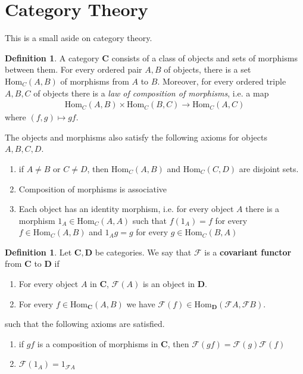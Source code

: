 \documentclass[12pt]{book}
\theoremstyle{definition}
\newtheorem{definition}[theorem]{Definition}
\begin{document}
\section{Category Theory}
This is a small aside on category theory. 
\begin{definition}
    A category \textbf{C} consists of a class of objects and sets of morphisms between them. For every ordered pair $A, B$ of objects, there is a set $\text{Hom}_C(A,B)$ of morphisms from $A$ to $B$. Moreover, for every ordered triple $A, B, C$ of objects there is a \textit{law of composition of morphisms}, i.e. a map 
    \begin{align*}
        \text{Hom}_C(A,B) \times \text{Hom}_C(B,C) \rightarrow \text{Hom}_C(A,C)
    \end{align*}
    where $(f,g) \mapsto gf$. 
\end{definition}
The objects and morphisms also satisfy the following axioms for objects $A, B, C, D$. 
\begin{enumerate}
    \item if $A \neq B$ or $C \neq D$, then $\text{Hom}_C(A,B)$ and $\text{Hom}_C(C,D)$ are disjoint sets. 
    \item Composition of morphisms is associative 
    \item Each object has an identity morphism, i.e. for every object $A$ there is a morphism $1_A \in \text{Hom}_C(A,A)$ such that $f(1_A) = f$ for every $f \in \text{Hom}_C(A,B)$ and $1_Ag = g$ for every $g \in \text{Hom}_C(B, A)$
\end{enumerate}

\begin{definition}
    Let $\mathbf{C,D}$ be categories. We say that $\mathcal{F}$ is a \textbf{covariant functor} from $\mathbf{C}$ to $\mathbf{D}$ if 
    \begin{enumerate}
        \item For every object $A$ in $\mathbf{C}$, $\mathcal{F}(A)$ is an object in $\mathbf{D}$. 
        \item For every $f \in \text{Hom}_\mathbf{C}(A,B)$ we have $\mathcal{F}(f) \in \text{Hom}_\mathbf{D}(\mathcal{F}A, \mathcal{F}B)$.  
    \end{enumerate}
    such that the following axioms are satisfied. 
    \begin{enumerate}
        \item if $gf$ is a composition of morphisms in $\mathbf{C}$, then $\mathcal{F}(gf) = \mathcal{F}(g)\mathcal{F}(f)$
        \item $\mathcal{F}(1_A) = 1_{\mathcal{F}A}$
    \end{enumerate}
\end{definition} 
    
\end{document}
